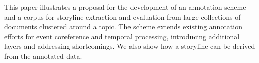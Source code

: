 This paper illustrates a proposal for the development of an annotation scheme and a corpus for storyline extraction and evaluation from large collections of documents clustered around a topic. The scheme extends existing annotation efforts for event coreference and temporal processing, introducing additional layers and addressing shortcomings. We also show how a storyline can be derived from the annotated data.

